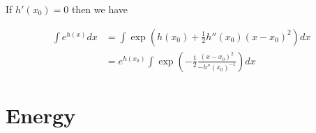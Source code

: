 \documentclass{article}
\begin{document}
If $h'(x_0)=0$ then we have

\begin{equation}\label{eq:8}
    \begin{aligned}
        \int e^{h(x)} dx &= \int \exp(h(x_0)+\frac{1}{2}h''(x_0)(x-x_0)^2)dx \\ &= e^{h(x_0)} \int \exp (-\frac{1}{2}\frac{(x-x_0)^2}{-h''(x_0)^{-1}})dx
    \end{aligned}
\end{equation}

\section{Energy}
\end{document}
